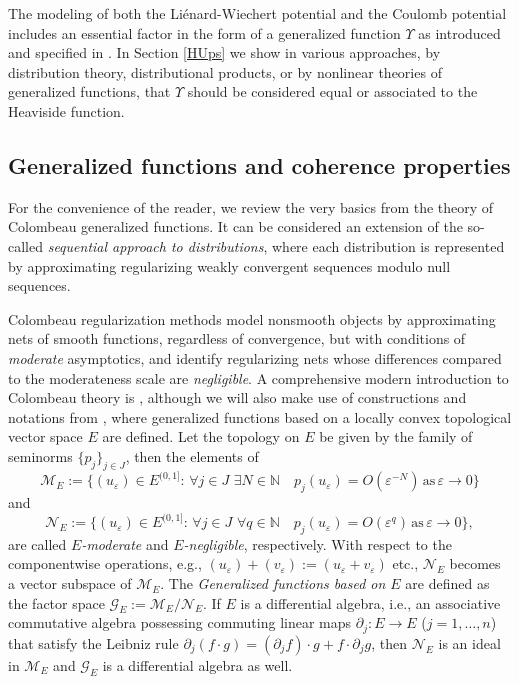 \documentclass[sumlimits,intlimits,namelimits%
]{amsart}
\newcommand{\G}{\ensuremath{\mathcal{G}}}
\newcommand{\mb}[1]{\ensuremath{\mathbb{#1}}}
\newcommand{\N}{\mb{N}}
\renewcommand{\d}{\ensuremath{\partial}}
\theoremstyle{definition}
\newcommand{\col}{\colon}
\newcommand{\eps}{\varepsilon}
\begin{document}
The modeling of both the Li\'{e}nard-Wiechert potential and the Coulomb potential includes an essential factor in the form of a generalized function $\Upsilon$ as introduced and specified in \cites{GEW,GEJP,GPOT}. In Section \ref{HUps} we show in various approaches, by distribution theory, distributional products, or by nonlinear theories of generalized functions, that $\Upsilon$ should be considered equal or associated to the Heaviside function.

\subsection*{Generalized functions and coherence properties} 


For the convenience of the reader, we review the very basics from the theory of Colombeau generalized functions. It can be considered an extension of the so-called \emph{sequential approach to distributions}, where each distribution is represented by approximating regularizing weakly convergent sequences modulo null sequences. 


Colombeau regularization methods model nonsmooth objects by approximating nets of smooth functions, regardless of convergence, but with conditions of \emph{moderate} asymptotics, and identify regularizing nets whose differences compared to the moderateness scale are \emph{negligible}. A comprehensive modern introduction to Colombeau theory is \cite{GKOS:01}, although we will also make use of constructions and notations from \cite{Garetto:05b}, where  generalized functions based on a locally convex topological vector space $E$ are defined. Let the topology on $E$ be given by the family of seminorms $\{p_j\}_{j\in J}$, then the elements of  
$$
 \mathcal{M}_E := \{(u_\eps) \in E^{(0,1]}:\, \forall j\in J\,\, \exists N\in\N\quad p_j(u_\eps)=O(\eps^{-N})\, \text{as}\, \eps\to 0\}
$$
and
$$
 \mathcal{N}_E := \{(u_\eps) \in E^{(0,1]}:\, \forall j\in J\,\, \forall q\in\N\quad p_j(u_\eps)=O(\eps^{q})\, \text{as}\, \eps\to 0\},
$$ 
are called \emph{$E$-moderate} and \emph{$E$-negligible}, respectively. With respect to the componentwise operations, e.g., $(u_\eps) + (v_\eps) := (u_\eps + v_\eps)$ etc., $\mathcal{N}_E$ becomes a vector subspace of $\mathcal{M}_E$.  The \emph{Generalized functions based on $E$} are defined as the factor space $\G_E := \mathcal{M}_E / \mathcal{N}_E$. If $E$ is a differential algebra, i.e., an associative commutative algebra possessing commuting linear maps $\d_j \col E \to E$ ($j=1,\ldots,n$) that satisfy the Leibniz rule $\d_j( f \cdot g) = (\d_j f) \cdot g + f \cdot \d_j g$,  then $\mathcal{N}_E$ is an ideal in $\mathcal{M}_E$ and $\G_E$ is  a differential algebra as well.
\end{document}
